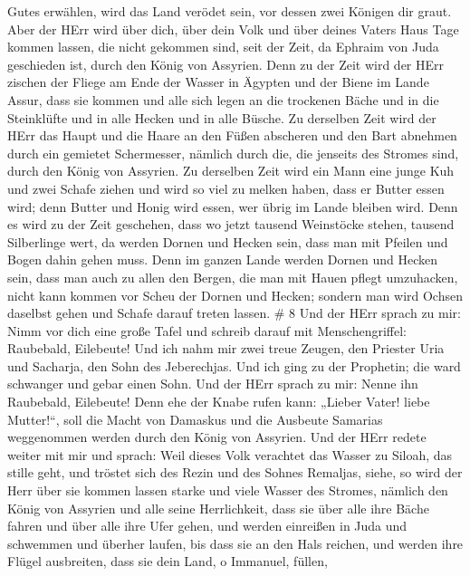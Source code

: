 Gutes erwählen, wird das Land verödet sein, vor dessen zwei Königen dir
graut.  Aber der HErr wird über dich, über dein Volk und
über deines Vaters Haus Tage kommen lassen, die nicht gekommen sind,
seit der Zeit, da Ephraim von Juda geschieden ist, durch den König von
Assyrien.  Denn zu der Zeit wird der HErr zischen der
Fliege am Ende der Wasser in Ägypten und der Biene im Lande Assur,
 dass sie kommen und alle sich legen an die trockenen Bäche
und in die Steinklüfte und in alle Hecken und in alle Büsche.
 Zu derselben Zeit wird der HErr das Haupt und die Haare an
den Füßen abscheren und den Bart abnehmen durch ein gemietet
Schermesser, nämlich durch die, die jenseits des Stromes sind, durch den
König von Assyrien.  Zu derselben Zeit wird ein Mann eine
junge Kuh und zwei Schafe ziehen  und wird so viel zu
melken haben, dass er Butter essen wird; denn Butter und Honig wird
essen, wer übrig im Lande bleiben wird.  Denn es wird zu
der Zeit geschehen, dass wo jetzt tausend Weinstöcke stehen, tausend
Silberlinge wert, da werden Dornen und Hecken sein,  dass
man mit Pfeilen und Bogen dahin gehen muss. Denn im ganzen Lande werden
Dornen und Hecken sein,  dass man auch zu allen den Bergen,
die man mit Hauen pflegt umzuhacken, nicht kann kommen vor Scheu der
Dornen und Hecken; sondern man wird Ochsen daselbst gehen und Schafe
darauf treten lassen. \# 8  Und der HErr sprach zu mir: Nimm
vor dich eine große Tafel und schreib darauf mit Menschengriffel:
Raubebald, Eilebeute!  Und ich nahm mir zwei treue Zeugen,
den Priester Uria und Sacharja, den Sohn des Jeberechjas. 
Und ich ging zu der Prophetin; die ward schwanger und gebar einen Sohn.
Und der HErr sprach zu mir: Nenne ihn Raubebald, Eilebeute! 
Denn ehe der Knabe rufen kann: „Lieber Vater! liebe Mutter!{}``, soll
die Macht von Damaskus und die Ausbeute Samarias weggenommen werden
durch den König von Assyrien.  Und der HErr redete weiter
mit mir und sprach:  Weil dieses Volk verachtet das Wasser
zu Siloah, das stille geht, und tröstet sich des Rezin und des Sohnes
Remaljas,  siehe, so wird der Herr über sie kommen lassen
starke und viele Wasser des Stromes, nämlich den König von Assyrien und
alle seine Herrlichkeit, dass sie über alle ihre Bäche fahren und über
alle ihre Ufer gehen,  und werden einreißen in Juda und
schwemmen und überher laufen, bis dass sie an den Hals reichen, und
werden ihre Flügel ausbreiten, dass sie dein Land, o Immanuel, füllen,
